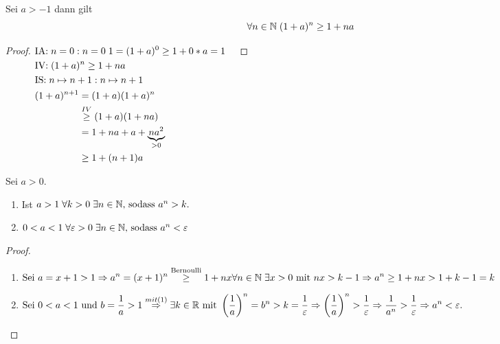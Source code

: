 \documentclass[a4paper,titlepage,oneside]{article}
\def\N{\ensuremath{\mathbb{N}} }
\def\R{\ensuremath{\mathbb{R}} }
\renewcommand{\epsilon}{\ensuremath{\varepsilon} }
\newcommand{\IA}[1][n=0]{\vspace{0.1pt}\ensuremath{\text{IA:}\sp#1:}}
\newcommand{\IV}{\vspace{0.1pt}\ensuremath{\text{IV:}\sp}}
\newcommand{\IS}[1][n \mapsto n+1]{\vspace{0.1pt}\ensuremath{\text{IS:}\sp#1:}}
\def\fa{\ensuremath{\forall}}
\def\sp{\hspace{0,1cm}}
\theoremstyle{thmstyle}
\begin{document}
\begin{subsatz}
Sei \(a > -1\) dann gilt \[\fa n \in \N \sp (1+a)^n \ge 1 + na \]
\begin{proof}
\begin{math}
\begin{aligned}[t]
	&\IA{n=0} \sp 1 = (1 + a)^0 \ge 1 + 0*a = 1					&&\\
	&\IV (1+a)^n \ge 1 + na								&&\\
	&\IS{n \mapsto n+1} \\
	&\begin{aligned}[t]
		(1+a)^{n+1} 	&= (1+a)(1+a)^n 					&&\\
					&\overset{IV}{\ge} (1 + a)(1 + na) 		&&\\
					&= 1 + na + a + \underbrace{na^2}_{> 0} 	&&\\
					&\ge 1 + (n+1)a \end{aligned}
\end{aligned}\\
\end{math}
\end{proof}
\end{subsatz}
\newpage

\begin{subkorr}
Sei \(a > 0\).
\begin{enumerate}[label=(\arabic*)]
	\item Ist \sp \(a > 1 \sp \forall k > 0 \sp \exists n \in \N \text{, sodass }a^n > k.\)
	\item \(0 < a < 1 \sp \forall \epsilon > 0 \sp \exists n \in \N \text{, sodass }a^n < \epsilon\)
\end{enumerate}
\begin{proof}\sp
\begin{enumerate}[label=(\arabic*)]
	\item \begin{math} \displaystyle
		\text{Sei } a = x + 1 > 1 \Rightarrow a^n = (x + 1)^n \overset{\text{Bernoulli}}{\ge} 1 + nx \\
		\forall n \in \N \sp \exists x > 0 \text{ mit } nx > k - 1 \Rightarrow a^n \ge 1 + nx > 1 + k -1 = k
		\end{math}
	\item \begin{math} \displaystyle
		\text{Sei } 0 < a < 1 \text{ und } b = \frac{1}{a} > 1 \overset{mit (1)}{\Rightarrow} \exists k \in \R \text{ mit }  \left(\frac{1}{a}\right)^n = b^n > k = \frac{1}{\epsilon}\\
		\Rightarrow  \left(\frac{1}{a}\right)^n > \frac{1}{\epsilon} \Rightarrow  \frac{1}{a^n} > \frac{1}{\epsilon} \Rightarrow a^n < \epsilon.
		\end{math}
\end{enumerate}
\end{proof}
\end{subkorr}
\end{document}
